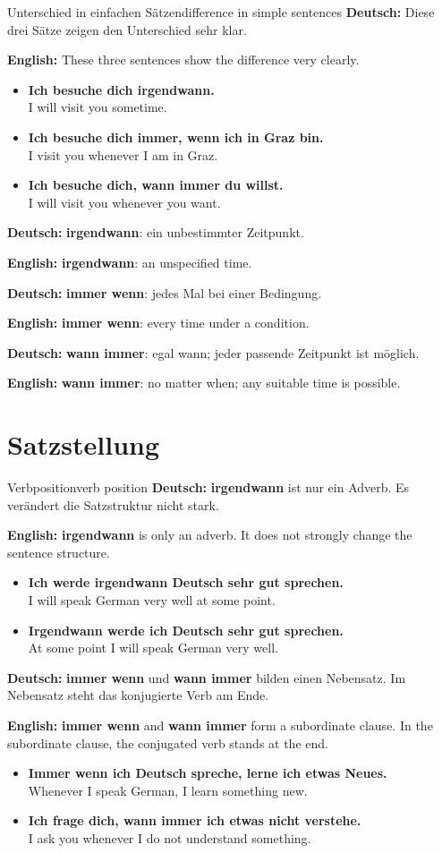 \documentclass[a4paper,11pt]{article}
\newcommand{\GermanText}[1]{\textbf{Deutsch: }#1\par}
\newcommand{\EnglishText}[1]{{\small\color{SoftGray}\textbf{English: }#1\par}}
\newcommand{\ExampleItem}[2]{\item \textbf{#1}\\{\small\color{SoftGray}#2}}
\begin{document}
\begin{grammarentry}{Unterschied in einfachen Sätzen}{difference in simple sentences}
\GermanText{Diese drei Sätze zeigen den Unterschied sehr klar.}
\EnglishText{These three sentences show the difference very clearly.}

\begin{exbox}
\begin{itemize}
    \ExampleItem{Ich besuche dich irgendwann.}{I will visit you sometime.}
    \ExampleItem{Ich besuche dich immer, wenn ich in Graz bin.}{I visit you whenever I am in Graz.}
    \ExampleItem{Ich besuche dich, wann immer du willst.}{I will visit you whenever you want.}
\end{itemize}
\end{exbox}

\GermanText{\textbf{irgendwann}: ein unbestimmter Zeitpunkt.}
\EnglishText{\textbf{irgendwann}: an unspecified time.}

\GermanText{\textbf{immer wenn}: jedes Mal bei einer Bedingung.}
\EnglishText{\textbf{immer wenn}: every time under a condition.}

\GermanText{\textbf{wann immer}: egal wann; jeder passende Zeitpunkt ist möglich.}
\EnglishText{\textbf{wann immer}: no matter when; any suitable time is possible.}
\end{grammarentry}

\section{Satzstellung}

\begin{grammarentry}{Verbposition}{verb position}
\GermanText{\textbf{irgendwann} ist nur ein Adverb. Es verändert die Satzstruktur nicht stark.}
\EnglishText{\textbf{irgendwann} is only an adverb. It does not strongly change the sentence structure.}

\begin{exbox}
\begin{itemize}
    \ExampleItem{Ich werde irgendwann Deutsch sehr gut sprechen.}{I will speak German very well at some point.}
    \ExampleItem{Irgendwann werde ich Deutsch sehr gut sprechen.}{At some point I will speak German very well.}
\end{itemize}
\end{exbox}

\GermanText{\textbf{immer wenn} und \textbf{wann immer} bilden einen Nebensatz. Im Nebensatz steht das konjugierte Verb am Ende.}
\EnglishText{\textbf{immer wenn} and \textbf{wann immer} form a subordinate clause. In the subordinate clause, the conjugated verb stands at the end.}

\begin{exbox}
\begin{itemize}
    \ExampleItem{Immer wenn ich Deutsch spreche, lerne ich etwas Neues.}{Whenever I speak German, I learn something new.}
    \ExampleItem{Ich frage dich, wann immer ich etwas nicht verstehe.}{I ask you whenever I do not understand something.}
\end{itemize}
\end{exbox}
\end{grammarentry}
\end{document}
